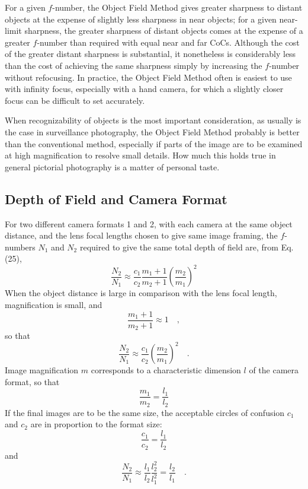 \documentclass[11pt, oneside]{scrartcl}   	%
\begin{document}
For a given $f$-number, the Object Field Method gives greater sharpness to distant objects at the expense of slightly less sharpness in near objects; for a given near-limit sharpness, the greater sharpness of distant objects comes at the expense of a greater $f$-number than required with equal near and far CoCs. Although the cost of the greater distant sharpness is substantial, it nonetheless is considerably less than the cost of achieving the same sharpness simply by increasing the $f$-number without refocusing. In practice, the Object Field Method often is easiest to use with infinity focus, especially with a hand camera, for which a slightly closer focus can be difficult to set accurately.

When recognizability of objects is the most important consideration, as usually is the case in surveillance photography, the Object Field Method probably is better than the conventional method, especially if parts of the image are to be examined at high magnification to resolve small details. How much this holds true in general pictorial photography is a matter of personal taste.

\subsection{Depth of Field and Camera Format}

For two different camera formats 1 and 2, with each camera at the same object distance, and the lens focal lengths chosen to give same image framing, the $f$-numbers $N_1 $ and $N_2$ required to give the same total depth of field are, from Eq. (25),
\begin{equation}
\frac{N_2}{N_1}\approx\frac{c_1}{c_2}\frac{m_1+1}{m_2+1}\left(\frac{m_2}{m_1}\right)^2
   \label{eq:72}
\end{equation}
When the object distance is large in comparison with the lens focal length, magnification is small, and
\begin{equation}
\frac{m_1+1}{m_2+1} \approx 1\quad,
\end{equation}
so that
\begin{equation}
\frac{N_2}{N_1}\approx\frac{c_1}{c_2}\left(\frac{m_2}{m_1}\right)^2\quad.
   \label{eq:73}
\end{equation}
Image magnification $m$ corresponds to a characteristic dimension $l$ of the camera format, so that
\begin{equation}
\frac{m_1}{m_2} = \frac{l_1}{l_2}
   \label{eq:74}
\end{equation}
If the final images are to be the same size, the acceptable circles of confusion $c_1$ and $c_2$ are in proportion to the format size:
\begin{equation}
\frac{c_1}{c_2} = \frac{l_1}{l_2}
   \label{eq:75}
\end{equation}
and
\begin{equation}
\frac{N_2}{N_1}\approx \frac{l_1}{l_2}  \frac{l_2^2}{l_1^2} =  \frac{l_2}{l_1}\quad.
   \label{eq:73}
\end{equation}
\end{document}
